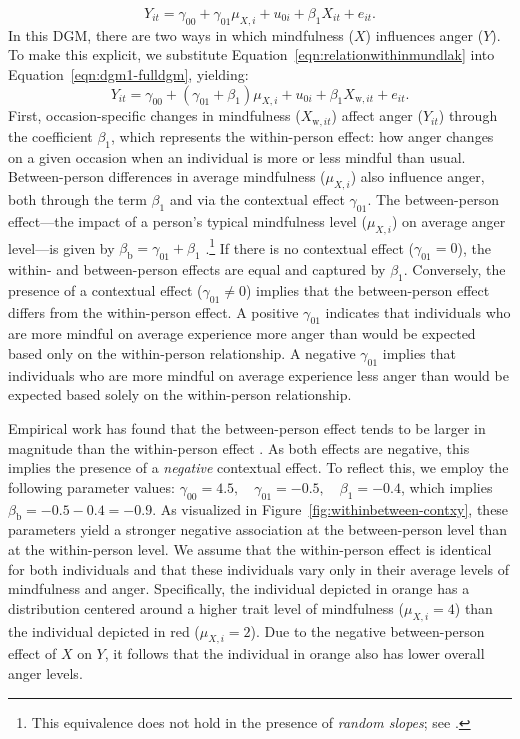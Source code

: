 \documentclass[stu]{apa7}
\begin{document}
\begin{equation}
    \label{eqn:dgm1-fulldgm}
    Y_{it} = \gamma_{00} + \gamma_{01} \mu_{X,i} + u_{0i} + \beta_1 X_{it} + e_{it}.
\end{equation}
In this DGM, there are two ways in which mindfulness ($X$) influences anger ($Y$). To make this explicit, we substitute Equation~\ref{eqn:relationwithinmundlak} into Equation~\ref{eqn:dgm1-fulldgm}, yielding:
\begin{equation}
    Y_{it} = \gamma_{00} + (\gamma_{01} + \beta_1) \mu_{X,i} + u_{0i} + \beta_1 X_{\text{w},it} + e_{it}.
\end{equation}
First, occasion-specific changes in mindfulness ($X_{\text{w},it}$) affect anger ($Y_{it}$) through the coefficient $\beta_1$, which represents the within-person effect: how anger changes on a given occasion when an individual is more or less mindful than usual. Between-person differences in average mindfulness ($\mu_{X,i}$) also influence anger, both through the term $\beta_1$ and via the contextual effect $\gamma_{01}$. The between-person effect—the impact of a person's typical mindfulness level (\( \mu_{X,i} \)) on average anger level—is given by $\beta_\text{b} = \gamma_{01} + \beta_1$ \parencite{mundlak_pooling_1978}.\footnote{This equivalence does not hold in the presence of \textit{random slopes}; see \textcite{snijders_multilevel_2011}.} If there is no contextual effect ($\gamma_{01} = 0$), the within- and between-person effects are equal and captured by $\beta_1$. Conversely, the presence of a contextual effect ($\gamma_{01} \neq 0$) implies that the between-person effect differs from the within-person effect. A positive \( \gamma_{01} \) indicates that individuals who are more mindful on average experience more anger than would be expected based only on the within-person relationship. A negative \( \gamma_{01} \) implies that individuals who are more mindful on average experience less anger than would be expected based solely on the within-person relationship.

Empirical work has found that the between-person effect tends to be larger in magnitude than the within-person effect \parencite[$\beta_\text{b} > \beta_1$;][]{eisenlohr-moul_both_2016}. As both effects are negative, this implies the presence of a \textit{negative} contextual effect. To reflect this, we employ the following parameter values: $
\gamma_{00} = 4.5,\quad \gamma_{01} = -0.5,\quad \beta_1 = -0.4$, which implies $\beta_\text{b} = -0.5 - 0.4 = -0.9$. As visualized in Figure~\ref{fig:withinbetween-contxy}, these parameters yield a stronger negative association at the between-person level than at the within-person level. We assume that the within-person effect is identical for both individuals and that these individuals vary only in their average levels of mindfulness and anger. Specifically, the individual depicted in orange has a distribution centered around a higher trait level of mindfulness ($\mu_{X,i} = 4$) than the individual depicted in red ($\mu_{X,i} = 2$). Due to the negative between-person effect of $X$ on $Y$, it follows that the individual in orange also has lower overall anger levels.
\end{document}
